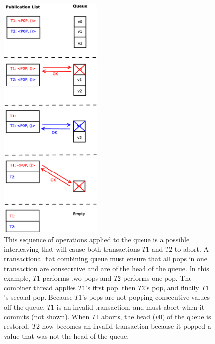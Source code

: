 \begin{figure}[H]
\centering
\includegraphics[width=0.45\textwidth]{fcqueue_publist}
    \caption[Invalid interleaving of pop requests in the flat combining queue]{This sequence of operations applied to the queue is a possible interleaving that will cause both transactions $T1$ and $T2$ to abort. A transactional flat combining queue must ensure that all pops in one transaction are consecutive and are of the head of the queue. In this example, $T1$ performs two pops and $T2$ performs one pop. The combiner thread applies $T1$'s first pop, then $T2$'s pop, and finally $T1$'s second pop. Because $T1$'s pops are not popping consecutive values off the queue, $T1$ is an invalid transaction, and must abort when it commits (not shown). When $T1$ aborts, the head ($v0$) of the queue is restored. $T2$ now becomes an invalid transaction because it popped a value that was not the head of the queue.}
\label{fig:fcqueue_publist}
\end{figure}


